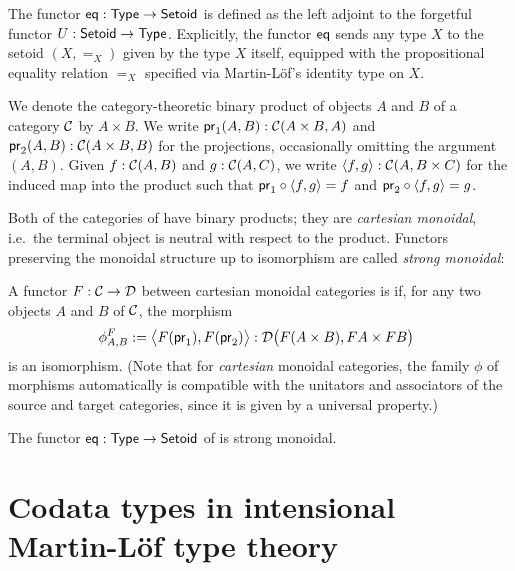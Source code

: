 \documentclass[envcountsame]{llncs}
\begin{document}
\begin{definition}\label{def:eq}
 The functor $\eq : \Set\to\Setoid$ is defined as the left adjoint to the forgetful functor $U : \Setoid \to \Set$.
  Explicitly, the functor $\eq$ sends any type $X$ to the setoid $(X,=_X)$ given by the type $X$ itself, equipped
  with the propositional equality relation $=_X$ specified via Martin-L\"of's identity type on $X$.
\end{definition}


\begin{remark}
  We denote the category-theoretic binary product of objects $A$ and $B$ of a category $\C$ by $A\times B$.
  We write $\pr_1(A,B) : \C(A\times B, A)$ and $\pr_2(A,B) :\C(A\times B, B)$ for the projections, occasionally omitting the 
  argument $(A,B)$.
  Given $f : \C(A, B)$ and $g : \C(A,C)$, we write $\langle f,g\rangle : \C(A,B\times C)$ for the induced map into the product such that
  $\comp{\langle f,g\rangle}{\pr_1} = f$ and $\comp{\langle f,g\rangle}{\pr_2} = g$.
\end{remark}

Both of the categories of  have binary products; they are \emph{cartesian monoidal}, i.e.\ the terminal 
object is neutral with respect to the product. Functors preserving the monoidal structure up to isomorphism
are called \emph{strong monoidal}:

\begin{definition}\label{def:monoidal_functor}
 A functor $F:\C\to\D$ between cartesian monoidal categories is  if, for any two objects $A$ and $B$ of $\C$,
  the morphism
 \[ \phi^F_{A,B} := \bigl\langle F(\pr_1), F(\pr_2) \bigr\rangle : \D\bigl(F(A\times B), FA\times FB\bigr)\enspace  \] 
 is an isomorphism.
 (Note that for \emph{cartesian} monoidal categories, the family $\phi$ of morphisms automatically 
  is compatible with the unitators and associators of the source and target categories, 
  since it is given by a universal property.)
\end{definition}

\begin{example}
  The functor $\eq: \Set \to \Setoid$ of  is strong monoidal.
\end{example}


\section{Codata types in intensional Martin-L\"of type theory}\label{sec:tri}
\end{document}
